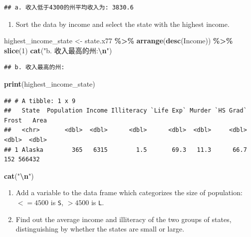 \documentclass[
]{article}
\newenvironment{Shaded}{\begin{snugshade}}{\end{snugshade}}
\newcommand{\DecValTok}[1]{\textcolor[rgb]{0.00,0.00,0.81}{#1}}
\newcommand{\FunctionTok}[1]{\textcolor[rgb]{0.13,0.29,0.53}{\textbf{#1}}}
\newcommand{\NormalTok}[1]{#1}
\newcommand{\OtherTok}[1]{\textcolor[rgb]{0.56,0.35,0.01}{#1}}
\newcommand{\SpecialCharTok}[1]{\textcolor[rgb]{0.81,0.36,0.00}{\textbf{#1}}}
\newcommand{\StringTok}[1]{\textcolor[rgb]{0.31,0.60,0.02}{#1}}
\providecommand{\tightlist}{%
  \setlength{\itemsep}{0pt}\setlength{\parskip}{0pt}}
\begin{document}
\begin{verbatim}
## a. 收入低于4300的州平均收入为: 3830.6
\end{verbatim}

\begin{enumerate}
\def\labelenumi{\alph{enumi}.}
\setcounter{enumi}{1}
\tightlist
\item
  Sort the data by income and select the state with the highest income.
\end{enumerate}

\begin{Shaded}
\begin{Highlighting}[]
\NormalTok{highest\_income\_state }\OtherTok{\textless{}{-}}\NormalTok{ state.x77 }\SpecialCharTok{\%\textgreater{}\%}
  \FunctionTok{arrange}\NormalTok{(}\FunctionTok{desc}\NormalTok{(Income)) }\SpecialCharTok{\%\textgreater{}\%}
  \FunctionTok{slice}\NormalTok{(}\DecValTok{1}\NormalTok{)}
\FunctionTok{cat}\NormalTok{(}\StringTok{"b. 收入最高的州:}\SpecialCharTok{\textbackslash{}n}\StringTok{"}\NormalTok{)}
\end{Highlighting}
\end{Shaded}

\begin{verbatim}
## b. 收入最高的州:
\end{verbatim}

\begin{Shaded}
\begin{Highlighting}[]
\FunctionTok{print}\NormalTok{(highest\_income\_state)}
\end{Highlighting}
\end{Shaded}

\begin{verbatim}
## # A tibble: 1 x 9
##   State  Population Income Illiteracy `Life Exp` Murder `HS Grad` Frost   Area
##   <chr>       <dbl>  <dbl>      <dbl>      <dbl>  <dbl>     <dbl> <dbl>  <dbl>
## 1 Alaska        365   6315        1.5       69.3   11.3      66.7   152 566432
\end{verbatim}

\begin{Shaded}
\begin{Highlighting}[]
\FunctionTok{cat}\NormalTok{(}\StringTok{"}\SpecialCharTok{\textbackslash{}n}\StringTok{"}\NormalTok{)}
\end{Highlighting}
\end{Shaded}

\begin{enumerate}
\def\labelenumi{\alph{enumi}.}
\setcounter{enumi}{2}
\item
  Add a variable to the data frame which categorizes the size of
  population: \(<= 4500\) is \texttt{S}, \(> 4500\) is \texttt{L}.
\item
  Find out the average income and illiteracy of the two groups of
  states, distinguishing by whether the states are small or large.
\end{enumerate}
\end{document}
